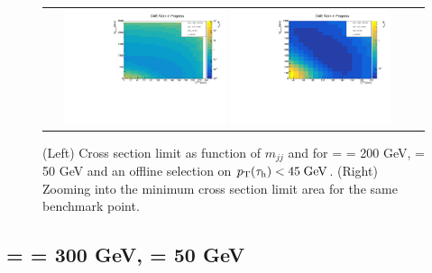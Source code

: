 \begin{figure}[tbh!]
	\centering
	\begin{tabular}{cc}
		\includegraphics[width=0.45\textwidth]{analysis/pics/JetInvMass_vs_MET_xsec_chi200_lsp050_taupt45.pdf}
		\includegraphics[width=0.45\textwidth]{analysis/pics/JetInvMass_vs_MET_xsec_chi200_lsp050_taupt45_zoom.pdf}
	\end{tabular}
	\caption{(Left) Cross section limit as function of $m_{jj}$ and \met for \charginopm = \neutralinotwo = 200 GeV, \neutralinoone = 50 GeV and an offline selection on $p_{\text{T}}(\tau_{\text{h}}) <  45\;\text{Ge}\kern-0.06667em\text{V}$. (Right) Zooming into the minimum cross section limit area for the same benchmark point.}
	\label{fig::JetInvMass_vs_MET_xsec_chi200_lsp050_taupt45}
\end{figure}

\FloatBarrier

\subsection*{\charginopm = \neutralinotwo = 300 GeV, \neutralinoone = 50 GeV}

\FloatBarrier

